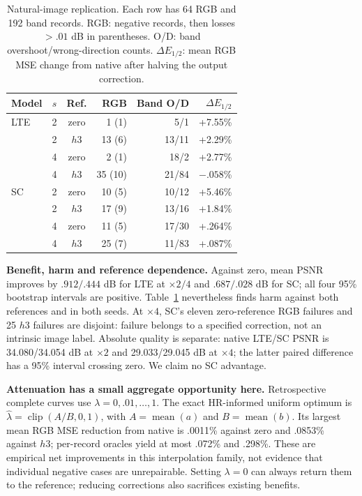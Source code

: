 \begin{table}[t]\centering
\caption{Natural-image replication. Each row has 64 RGB and 192 band
records. RGB: negative records, then losses $>.01$ dB in parentheses.
O/D: band overshoot/wrong-direction counts. $\Delta E_{1/2}$: mean RGB
MSE change from native after halving the output correction.}
\label{tab:failures}
\small
\begin{tabular}{lccrrr}\toprule
Model & $s$ & Ref. & RGB & Band O/D & $\Delta E_{1/2}$\\\midrule
LTE & 2 & zero & 1 (1) & 5/1 & +7.55\%\\
 & 2 & $h3$ & 13 (6) & 13/11 & +2.29\%\\
 & 4 & zero & 2 (1) & 18/2 & +2.77\%\\
 & 4 & $h3$ & 35 (10) & 21/84 & $-.058$\%\\\midrule
SC & 2 & zero & 10 (5) & 10/12 & +5.46\%\\
 & 2 & $h3$ & 17 (9) & 13/16 & +1.84\%\\
 & 4 & zero & 11 (5) & 17/30 & +.264\%\\
 & 4 & $h3$ & 25 (7) & 11/83 & +.087\%\\\bottomrule
\end{tabular}
\end{table}

\textbf{Benefit, harm and reference dependence.}
Against zero, mean PSNR improves by $.912/.444$ dB for LTE at $\times2/4$
and $.687/.028$ dB for SC; all four 95\% bootstrap intervals are positive.
Table~\ref{tab:failures} nevertheless finds harm against both references
and in both seeds. At $\times4$, SC's eleven zero-reference RGB failures
and 25 $h3$ failures are disjoint: failure belongs to a specified
correction, not an intrinsic image label.
Absolute quality is separate: native LTE/SC PSNR is 34.080/34.054 dB at
$\times2$ and 29.033/29.045 dB at $\times4$; the latter paired difference
has a 95\% interval crossing zero. We claim no SC advantage.

\textbf{Attenuation has a small aggregate opportunity here.}
Retrospective complete curves use $\lambda=0,.01,\ldots,1$.
The exact HR-informed uniform optimum is
$\hat\lambda=\operatorname{clip}(A/B,0,1)$, with
$A=\operatorname{mean}(a)$ and $B=\operatorname{mean}(b)$.
Its largest mean RGB MSE reduction from native is .0011\% against zero
and .0853\% against $h3$; per-record oracles yield at most .072\% and
.298\%. These are empirical net improvements in this interpolation
family, not evidence that individual negative cases are unrepairable.
Setting $\lambda=0$ can always return them to the reference; reducing
corrections also sacrifices existing benefits.


